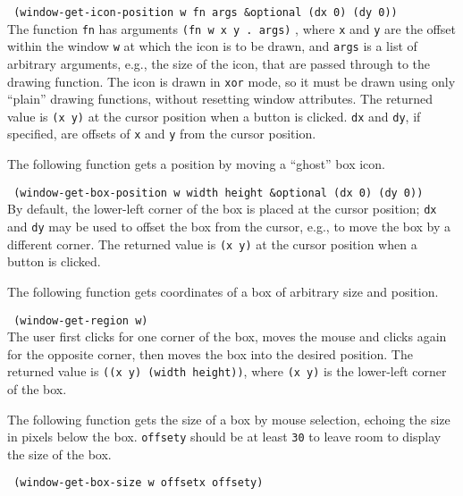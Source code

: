 {\tt \hspace*{0.5in} (window-get-icon-position w fn args \&optional (dx 0)
 (dy 0))} \\

\vspace{-0.15in}
The function {\tt fn} has arguments {\tt (fn w x y . args)} , where {\tt x}
and {\tt y} are the offset within the window {\tt w} at which the icon is
to be drawn, and {\tt args} is a list of arbitrary arguments, e.g., the size
of the icon, that are passed through to the drawing function.
The icon is drawn in {\tt xor} mode, so it must be drawn using
only ``plain'' drawing functions, without resetting window attributes.
The returned value is {\tt (x y)} at the cursor position when a button
is clicked.  {\tt dx} and {\tt dy}, if specified, are offsets of {\tt x}
and {\tt y} from the cursor position.

The following function gets a position by moving a ``ghost'' box icon.

{\tt \hspace*{0.5in} (window-get-box-position w width height \&optional (dx 0) (dy 0))} \\

\vspace{-0.15in}
By default, the lower-left corner of the box is placed at the cursor position;
{\tt dx} and {\tt dy} may be used to offset the box from the cursor, e.g.,
to move the box by a different corner.  The returned value is {\tt (x y)}
at the cursor position when a button is clicked.

The following function gets coordinates of a box of arbitrary size and
position.

{\tt \hspace*{0.5in} (window-get-region w)} \\

\vspace{-0.15in}
The user first clicks for one corner of the box, moves the
mouse and clicks again for the opposite corner, then moves the box into
the desired position. The returned value is \linebreak
{\tt ((x y) (width height))},
where {\tt (x y)} is the lower-left corner of the box.

The following function gets the size of a box by mouse selection,
echoing the size in pixels below the box.  {\tt offsety}
should be at least {\tt 30} to leave room to display the size of the box.

{\tt \hspace*{0.5in} (window-get-box-size w offsetx offsety)} \\


